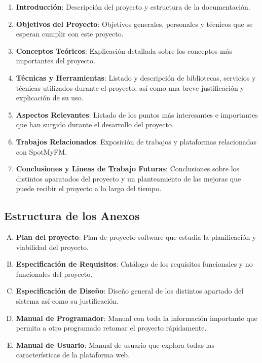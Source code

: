 \begin{enumerate}
    \item \textbf{Introducción}: Descripción del proyecto y estructura de la documentación.
    \item \textbf{Objetivos del Proyecto}: Objetivos generales, personales y técnicos que se esperan cumplir con este proyecto.
    \item \textbf{Conceptos Teóricos}: Explicación detallada sobre los conceptos más importantes del proyecto.
    \item \textbf{Técnicas y Herramientas}: Listado y descripción de bibliotecas, servicios y técnicas utilizados durante el proyecto, así como una breve justificación y explicación de su uso. 
    \item \textbf{Aspectos Relevantes}: Listado de los puntos más interesantes e importantes que han surgido durante el desarrollo del proyecto. 
    \item \textbf{Trabajos Relacionados}: Exposición de trabajos y plataformas relacionadas con SpotMyFM. 
    \item \textbf{Conclusiones y Lineas de Trabajo Futuras}: Conclusiones sobre los distintos aparatados del proyecto y un planteamiento de las mejoras que puede recibir el proyecto a lo largo del tiempo.
\end{enumerate}



\subsection{Estructura de los Anexos}

\begin{enumerate}[A.]
    \item \textbf{Plan del proyecto}: Plan de proyecto software que estudia la planificación y viabilidad del proyecto. 
    \item \textbf{Especificación de Requisitos}: Catálogo de los requisitos funcionales y no funcionales del proyecto.
    \item \textbf{Especificación de Diseño}: Diseño general de los distintos apartado del sistema así como su justificación.
    \item \textbf{Manual de Programador}: Manual con toda la información importante que permita a otro programado retomar el proyecto rápidamente.
    \item \textbf{Manual de Usuario}: Manual de usuario que explora todas las características de la plataforma web. 
\end{enumerate}

